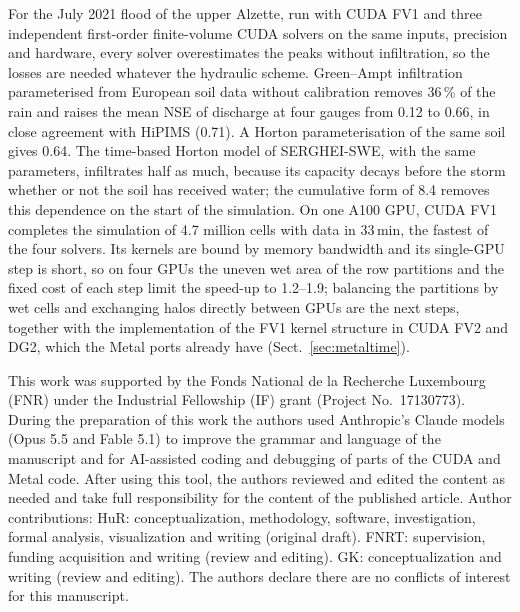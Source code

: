 \documentclass[draft,linenumbers]{agujournal2025}
\begin{document}
For the July 2021 flood of the upper Alzette, run with CUDA FV1 and three
independent first-order finite-volume CUDA solvers on the same inputs,
precision and hardware, every solver overestimates the peaks without
infiltration, so the losses are needed whatever the
hydraulic scheme. Green--Ampt infiltration parameterised from European soil
data without calibration removes 36\,\% of the rain and raises the mean NSE
of discharge at four gauges from 0.12 to 0.66, in close agreement with HiPIMS
(0.71). A Horton parameterisation of the same soil gives 0.64. The time-based
Horton model of SERGHEI-SWE, with the same parameters, infiltrates half as
much, because its capacity decays before the storm whether or not the soil
has received water; the cumulative form of 8.4 removes this dependence on the
start of the simulation. On one A100 GPU, CUDA FV1 completes the
simulation of 4.7 million cells with data in 33\,min, the fastest of the
four solvers.
Its kernels are bound by memory bandwidth and its single-GPU step is short,
so on four GPUs the uneven wet area of the row partitions and the fixed cost
of each step limit the speed-up to 1.2--1.9; balancing the partitions by wet
cells and exchanging halos directly between GPUs are the next steps, together
with the implementation of the FV1 kernel structure in CUDA FV2 and DG2,
which the Metal ports already have (Sect.~\ref{sec:metaltime}).

\acknowledgments
This work was supported by the Fonds National de la
Recherche Luxembourg (FNR) under the Industrial Fellowship (IF) grant
(Project No.\ 17130773). During the preparation of this work the authors used Anthropic's Claude
models (Opus 5.5 and Fable 5.1) to improve the grammar and language of the manuscript and for
AI-assisted coding and debugging of parts of the CUDA and Metal code. After using this
tool, the authors reviewed and edited the content as needed and take full
responsibility for the content of the published article. Author contributions: HuR: conceptualization, methodology, software,
investigation, formal analysis, visualization and writing (original draft).
FNRT: supervision, funding acquisition and writing (review and editing).
GK: conceptualization and writing (review and editing). The authors declare there are no conflicts of interest for this manuscript.
\end{document}
